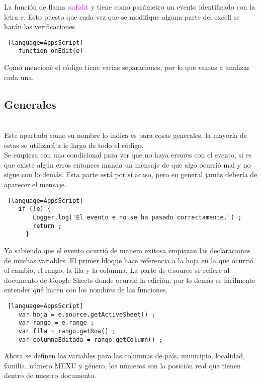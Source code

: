 \documentclass[12pt]{article} %
\begin{document}
    La función de llama \textcolor{magenta}{onEdit} y tiene como parámetro un evento identificado con la letra \textcolor{blue}{e}. Esto puesto que cada vez que se modifique alguna parte del excell se harán las verificaciones. \\
    
    \begin{lstlisting} [language=AppsScript]
    function onEdit(e)
    \end{lstlisting}

    Como mencioné el código tiene varias separaciones, por lo que vamos a analizar cada una.

    \subsection*{Generales}
    \\

    Este apartado como su nombre lo indica es para cosas generales, la mayoría de estas se utilizará a lo largo de todo el código. \\

    Se empieza con una condicional para ver que no haya errores con el evento, si es que existe algún erros entonces manda un mensaje de que algo ocurrió mal y no sigue con lo demás. Esta parte está por si acaso, pero en general jamás debería de aparecer el mensaje.
    

    \begin{lstlisting} [language=AppsScript]
    if (!e) {
        Logger.log('El evento e no se ha pasado correctamente.') ;
        return ;
      }
    \end{lstlisting}

    Ya sabiendo que el evento ocurrió de manera exitosa empiezan las declaraciones de muchas variables. El primer bloque hace referencia a la hoja en la que ocurrió el cambio, el rango, la fila y la columna. La parte de e.source se refiere al documento de Google Sheets donde ocurrió la edición, por lo demás es fácilmente entender qué hacen con los nombres de las funciones.
    
    \begin{lstlisting} [language=AppsScript]
    var hoja = e.source.getActiveSheet() ;
    var rango = e.range ;
    var fila = rango.getRow() ;
    var columnaEditada = rango.getColumn() ;
    \end{lstlisting}

    Ahora se definen las variables para las columnas de país, municipio, localidad, familia, número MEXU y género, los números son la posición real que tienen dentro de nuestro documento.
\end{document}
